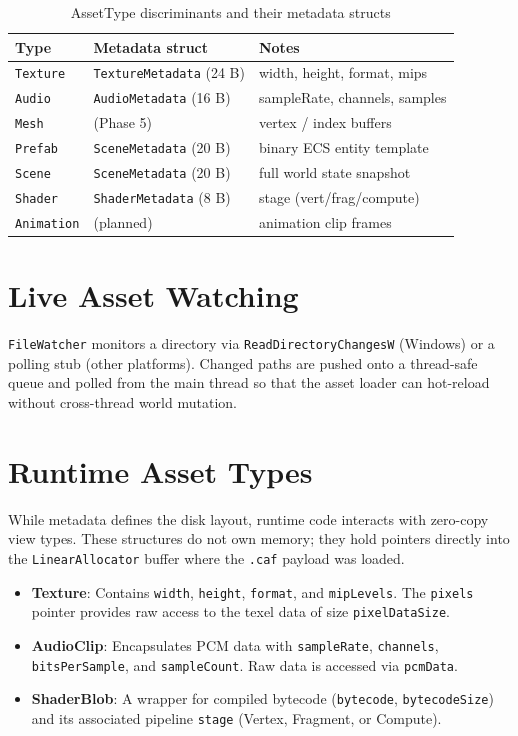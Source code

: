 \begin{table}[H]
\centering
\caption{AssetType discriminants and their metadata structs}
\begin{tabular}{lll}
\toprule
\textbf{Type} & \textbf{Metadata struct} & \textbf{Notes} \\
\midrule
\texttt{Texture}   & \texttt{TextureMetadata} (24 B)  & width, height, format, mips \\
\texttt{Audio}     & \texttt{AudioMetadata} (16 B)    & sampleRate, channels, samples \\
\texttt{Mesh}      & (Phase 5)                        & vertex / index buffers \\
\texttt{Prefab}    & \texttt{SceneMetadata} (20 B)    & binary ECS entity template \\
\texttt{Scene}     & \texttt{SceneMetadata} (20 B)    & full world state snapshot \\
\texttt{Shader}    & \texttt{ShaderMetadata} (8 B)    & stage (vert/frag/compute) \\
\texttt{Animation} & (planned)                        & animation clip frames \\
\bottomrule
\end{tabular}
\end{table}

\section{Live Asset Watching}

\texttt{FileWatcher} monitors a directory via
\texttt{ReadDirectoryChangesW} (Windows) or a polling stub (other
platforms). Changed paths are pushed onto a thread-safe queue and polled
from the main thread so that the asset loader can hot-reload without
cross-thread world mutation.

\section{Runtime Asset Types}

While metadata defines the disk layout, runtime code interacts with zero-copy view types.
These structures do not own memory; they hold pointers directly into the \texttt{LinearAllocator} 
buffer where the \texttt{.caf} payload was loaded.

\begin{itemize}
    \item \textbf{Texture}: Contains \texttt{width}, \texttt{height}, \texttt{format}, and \texttt{mipLevels}. The \texttt{pixels} pointer provides raw access to the texel data of size \texttt{pixelDataSize}.
    \item \textbf{AudioClip}: Encapsulates PCM data with \texttt{sampleRate}, \texttt{channels}, \texttt{bitsPerSample}, and \texttt{sampleCount}. Raw data is accessed via \texttt{pcmData}.
    \item \textbf{ShaderBlob}: A wrapper for compiled bytecode (\texttt{bytecode}, \texttt{bytecodeSize}) and its associated pipeline \texttt{stage} (Vertex, Fragment, or Compute).
\end{itemize}

